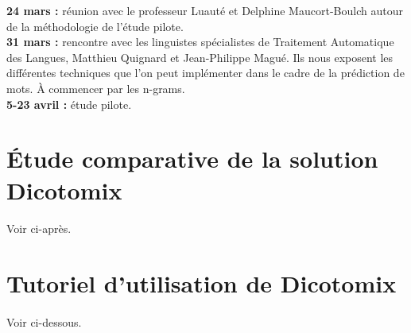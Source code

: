 \documentclass[11pt,a4paper]{article}
\theoremstyle{plain}
\theoremstyle{definition}
\begin{document}
\textbf{24 mars : } réunion avec le professeur Luauté et Delphine Maucort-Boulch autour de la méthodologie de l'étude pilote. \\

\textbf{31 mars : } rencontre avec les linguistes spécialistes de Traitement Automatique des Langues, Matthieu Quignard et Jean-Philippe Magué. Ils nous exposent les différentes techniques que l'on peut implémenter dans le cadre de la prédiction de mots. À commencer par les n-grams.\\

\textbf{5-23 avril : } étude pilote. \\
    

\section{Étude comparative de la solution Dicotomix}
\paragraph{} Voir ci-après.
\section{Tutoriel d'utilisation de Dicotomix}
\paragraph{} Voir ci-dessous.



\end{document}
